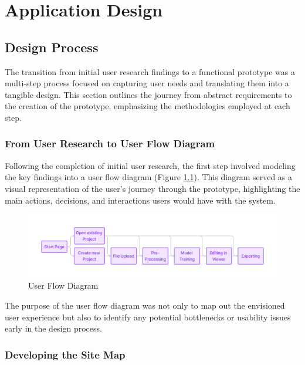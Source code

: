 %
\chapter{Application Design}
\label{sec:design}

\section{Design Process}
\label{sec:design:ux}

The transition from initial user research findings to a functional prototype was a multi-step process focused on capturing user needs and translating them into a tangible design. 
This section outlines the journey from abstract requirements to the creation of the prototype, emphasizing the methodologies employed at each step.

\subsection*{From User Research to User Flow Diagram}

Following the completion of initial user research, the first step involved modeling the key findings into a user flow diagram (Figure \ref{fig:design:flow-1}).
This diagram served as a visual representation of the user's journey through the prototype, highlighting the main actions, decisions, and interactions users would have with the system. 

\begin{figure}[htb]
	\includegraphics[width=\textwidth]{figures/flow-1.png}
	\caption{User Flow Diagram}
	\label{fig:design:flow-1}
\end{figure}

The purpose of the user flow diagram was not only to map out the envisioned user experience but also to identify any potential bottlenecks or usability issues early in the design process.

\subsection*{Developing the Site Map}

